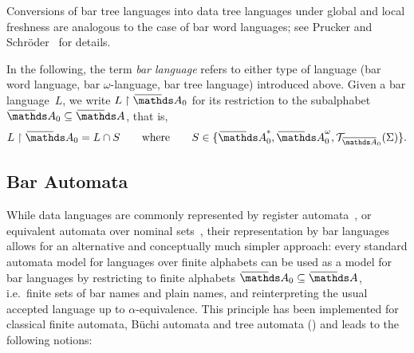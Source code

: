 \documentclass[a4paper,UKenglish,cleveref,autoref,thm-restate,numberwithinsect,final]{lipics-v2021}
\begin{document}
   Conversions of bar tree languages into data tree languages under global and local freshness are analogous to the case of
    bar word languages; see Prucker and Schröder~\cite{ps24} for details.

\begin{rem}
In the following, the term \emph{bar language} refers to either type of language (bar word language, bar $\omega$-language, bar tree language) introduced above. Given a bar language~$L$, we write $L\restriction \barNames_0$ for its restriction to the subalphabet $\barNames_0\seq \barNames$, that is,
\[
  L\restriction \barNames_0 = L\cap S
  \qquad\text{where}\qquad
  S \in \set{\barNames_0^*, \barNames_0^\omega, \bartree[{\barNamess}_0](\Sigma)}.\]
\end{rem}

\subsection{Bar Automata}\label{sec:bar-automata} While data languages are commonly represented by register automata~\cite{KaminskiFrancez94}, or equivalent automata over nominal sets~\cite{BojanczykEA14}, their representation by bar languages allows for an alternative and conceptually much simpler approach: every standard automata model for languages over finite alphabets can be used as a model for bar languages by restricting to finite alphabets $\barNames_0\seq \barNames$, i.e.~finite sets of bar names and plain names, and reinterpreting the usual accepted language up to $\alpha$-equivalence.
This principle has been implemented for 
classical finite automata, Büchi automata and tree automata () and leads to the following notions:
\end{document}
